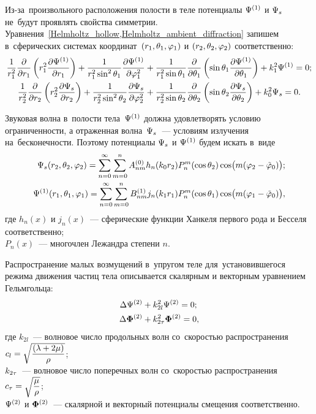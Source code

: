 Из-за~произвольного расположения полости в теле потенциалы $\P^{(1)}$ и $\P_s$ не~будут проявлять свойства симметрии.
Уравнения~\cref{Helmholtz_hollow,Helmholtz_ambient_diffraction} запишем в~сферических системах координат~$(r_1, \Q_1, \f_1)$ и $(r_2, \Q_2, \f_2)$ соответственно:
\begin{align}
\fr1{r_1^2}\fr\de{\de r_1}\left(r_1^2 \fr{\de\P^{(1)}}{\de r_1}\right) + \fr1{r_1^2\sin^2\Q_1}\fr{\de\P^{(1)}}{\de\f_1^2} &+ \fr1{r_1^2\sin\Q_1}\fr\de{\de\Q_1} \left(\sin\Q_1 \fr{\de\P^{(1)}}{\de\Q_1}\right) + k_1^2\P^{(1)} = 0;\\
\fr1{r_2^2}\fr\de{\de r_2}\left(r_2^2 \fr{\de\P_s}{\de r_2}\right) + \fr1{r_2^2\sin^2\Q_2}\fr{\de\P_s}{\de\f_2^2} &+ \fr1{r_2^2\sin\Q_2}\fr\de{\de\Q_2} \left(\sin\Q_2 \fr{\de\P_s}{\de\Q_2}\right) + k_0^2\P_s = 0.
\end{align}

Звуковая волна в~полости тела~$\P^{(1)}$ должна удовлетворять условию ограниченности, а отраженная волна~$\P_s$~--- условиям излучения на~бесконечности. Поэтому потенциалы $\P_s$ и $\P^{(1)}$ будем искать в~виде 
\begin{align}\P_s(r_2, \Q_2, \f_2) = \sum\limits_{n = 0}^\infty \sum\limits_{m = 0}^n A_{nm}^{(0)} h_n(k_0 r_2) P_n^m(\cos\Q_2)\cos\bigl(m(\f_2-\ft_0)\bigr);\\
\P^{(1)}(r_1, \Q_1, \f_1) = \sum\limits_{n = 0}^\infty \sum\limits_{m = 0}^n B_{nm}^{(1)} j_n(k_1 r_1) P_n^m(\cos\Q_1)\cos\bigl(m(\f_1-\ft_0)\bigr),
\end{align}
где $h_n(x)$ и $j_n(x)$~--- сферические функции Ханкеля первого рода и Бесселя соответственно; \\
$P_n(x)$~--- многочлен Лежандра степени $n$.





Распространение малых возмущений в~упругом теле для~установившегося режима движения частиц тела описывается скалярным и векторным уравнением Гельмгольца:
\begin{align}
\Lap\P^{(2)} &+ k_{2l}^2\P^{(2)} = 0;\label{Helmholtz_scalar}\\
\Lap\F^{(2)} &+ k_{2\t}^2\F^{(2)} = 0,\label{Helmholtz_vector}
\end{align}
где $k_{2l}$~--- волновое число продольных волн со~скоростью распространения \break 
$c_l = \sqrt{\df{(\la + 2\mu)}\r}$;\\
$k_{2\t}$~--- волновое число поперечных волн со~скоростью распространения
$c_\t = \sqrt{\df\mu\r}$;\\
$\P^{(2)}$ и $\F^{(2)}$~--- скалярной и векторный потенциалы смещения соответственно.

